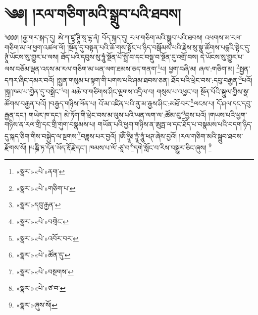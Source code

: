 \chapter{༄༅། །རལ་གཅིག་མའི་སྒྲུབ་པའི་ཐབས།}༄༅༅། །རྒྱ་གར་སྐད་དུ། ཨེ་ཀ་ཛཱ་ཊཱི་སཱ་དྷ་ནཾ། བོད་སྐད་དུ། རལ་གཅིག་མའི་སྒྲུབ་པའི་ཐབས། འཕགས་མ་རལ་གཅིག་མ་ལ་ཕྱག་འཚལ་ལོ། །སྔོན་དུ་བསྟན་པའི་ཆོ་གས་སྟོང་པ་ཉིད་བསྒོམས་པའི་རྗེས་སུ་སྣ་ཚོགས་པདྨའི་སྟེང་དུ་ཊཱཾ་ཡོངས་སུ་གྱུར་པ་ལས། ཐོད་པའི་དབུས་སུ་ཧཱུཾ་སྔོན་པོ་སྤྲོ་བ་དང་བསྡུ་བ་སྔོན་དུ་འགྲོ་བས། དེ་ཡོངས་སུ་གྱུར་པ་ལས་བཅོམ་ལྡན་འདས་མ་རལ་གཅིག་མ་ཡན་ལག་ཐམས་ཅད་གནག་\footnote{«སྣར་»«པེ་»ནག་}པ། ཕྱག་བཞི་མ། ཞལ་:གཅིག་མ། \footnote{«སྣར་»«པེ་»གཅིག་པ་}སྤྱན་དཀར་ཞིང་དམར་བའོ། །སྤྱན་གསུམ་པ་སྟག་གི་པགས་པའི་ཤམ་ཐབས་ཅན། ཐོད་པའི་ཕྲེང་བས་:དབུ་བརྒྱན་\footnote{«སྣར་»དབུ་རྒྱན་}པའོ། །སྐྲ་ཁམ་པ་གྱེན་དུ་བསྒྲེང་\footnote{«སྣར་»«པེ་»བགྲེང་}བ། མཆེ་བ་གཙིགས་ཤིང་ལྗགས་འདྲིལ་བ། གསུས་པ་འཕྱང་བ། སྔོན་པོའི་སྦྲུལ་གྱིས་སྣ་ཚོགས་བརྒྱན་པའོ། །བརྒྱད་གཉིས་ལོན་པ། འོ་མ་འཛིན་པའི་ནུ་མ་རྒྱས་ཤིང་:མཐོ་བར་\footnote{«སྣར་»«པེ་»འབོར་བར་}ལངས་པ། དོ་ཤལ་དང་དབུ་རྒྱན་དང་། གཡེར་ཁ་དང་། མེ་ཏོག་གི་ཕྲེང་བས་མ་ལུས་པའི་ཡན་ལག་ལ་:ཚོམ་བུ་\footnote{«སྣར་»«པེ་»ཚོན་དུ་}བྱས་པའོ། །གཡས་པའི་ཕྱག་གཉིས་ན་རལ་གྲི་དང་གྲི་གུག་བསྣམས་པ། གཡོན་པའི་ཕྱག་གཉིས་ན་ཨུཏྤ་ལ་དང་ཐོད་པ་བསྣམས་པའི་བདག་ཉིད་དུ་སྐད་ཅིག་གིས་བསྐྱེད་ལ་སྔགས་\footnote{«སྣར་»«པེ་»བསྔགས་}བཟླས་པར་བྱའོ། །ཨོཾ་ཧྲཱིཿ་ཏྲཱཾ་ཧཱུཾ་ཕཊ་ཞེས་བྱའོ། །རལ་གཅིག་མའི་སྒྲུབ་ཐབས་རྫོགས་སོ། །པཎྜི་ཏ་དོན་ཡོད་རྡོ་རྗེ་དང་། ཁམས་པ་ལོ་:ཙཱ་བ་\footnote{«སྣར་»«པེ་»ཙ་བ་}དགེ་སློང་བ་རིས་བསྒྱུར་ཅིང་ཞུས། \footnote{«སྣར་»ཞུས་སོ། }